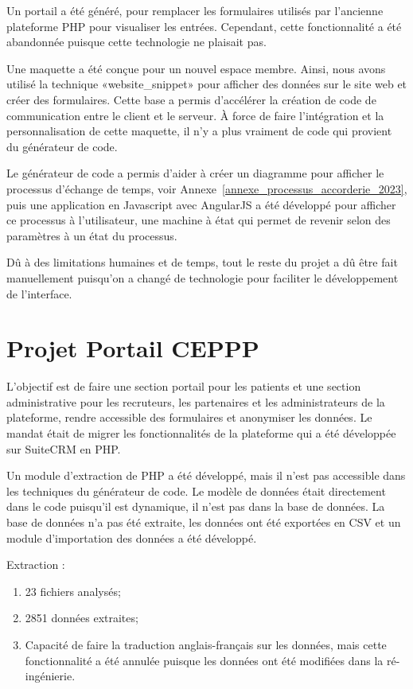 Un portail a été généré, pour remplacer les formulaires utilisés par l'ancienne plateforme PHP pour visualiser les entrées. Cependant, cette fonctionnalité a été abandonnée puisque cette technologie ne plaisait pas.

Une maquette a été conçue pour un nouvel espace membre. Ainsi, nous avons utilisé la technique «website\_snippet» pour afficher des données sur le site web et créer des formulaires. Cette base a permis d’accélérer la création de code de communication entre le client et le serveur. À force de faire l’intégration et la personnalisation de cette maquette, il n’y a plus vraiment de code qui provient du générateur de code.

Le générateur de code a permis d’aider à créer un diagramme pour afficher le processus d’échange de temps, voir Annexe~\ref{annexe_processus_accorderie_2023}, puis une application en Javascript avec AngularJS a été développé pour afficher ce processus à l’utilisateur, une machine à état qui permet de revenir selon des paramètres à un état du processus.

Dû à des limitations humaines et de temps, tout le reste du projet a dû être fait manuellement puisqu’on a changé de technologie pour faciliter le développement de l’interface.

\section{Projet Portail CEPPP}

L'objectif est de faire une section portail pour les patients et une section administrative pour les recruteurs, les partenaires et les administrateurs de la plateforme, rendre accessible des formulaires et anonymiser les données. Le mandat était de migrer les fonctionnalités de la plateforme qui a été développée sur SuiteCRM en PHP.

Un module d'extraction de PHP a été développé, mais il n'est pas accessible dans les techniques du générateur de code. Le modèle de données était directement dans le code puisqu'il est dynamique, il n'est pas dans la base de données. La base de données n'a pas été extraite, les données ont été exportées en CSV et un module d'importation des données a été développé.

Extraction : 
\begin{enumerate}
    \item 23 fichiers analysés;
    \item 2851 données extraites;
    \item Capacité de faire la traduction anglais-français sur les données, mais cette fonctionnalité a été annulée puisque les données ont été modifiées dans la ré-ingénierie.
\end{enumerate}

